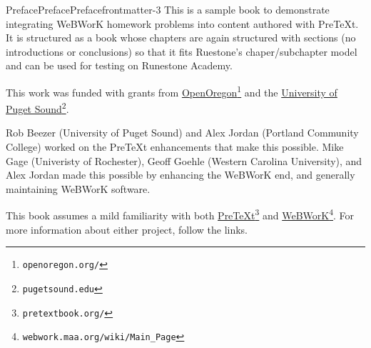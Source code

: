 \documentclass[oneside,10pt,]{book}
\numberwithin{equation}{section}
\begin{document}
\begin{preface}{Preface}{Preface}{}{Preface}{}{}{frontmatter-3}
This is a sample book to demonstrate integrating WeBWorK homework problems into content authored with PreTeXt.  It is structured as a book whose chapters are again structured with sections (no introductions or conclusions) so that it fits Ruestone's chaper\slash{}subchapter model and can be used for testing on Runestone Academy.%
\par
This work was funded with grants from \href{http://openoregon.org/}{OpenOregon}\footnote{\nolinkurl{openoregon.org/}\label{frontmatter-3-2-2}} and the \href{http://pugetsound.edu}{University of Puget Sound}\footnote{\nolinkurl{pugetsound.edu}\label{frontmatter-3-2-4}}.%
\par
Rob Beezer (University of Puget Sound) and Alex Jordan (Portland Community College) worked on the PreTeXt enhancements that make this possible. Mike Gage (Univeristy of Rochester), Geoff Goehle (Western Carolina University), and Alex Jordan made this possible by enhancing the WeBWorK end, and generally maintaining WeBWorK software.%
\par
This book assumes a mild familiarity with both \href{https://pretextbook.org/}{PreTeXt}\footnote{\nolinkurl{pretextbook.org/}\label{frontmatter-3-4-2}} and \href{http://webwork.maa.org/wiki/Main_Page}{WeBWorK}\footnote{\nolinkurl{webwork.maa.org/wiki/Main_Page}\label{frontmatter-3-4-4}}. For more information about either project, follow the links.%
\end{preface}
\setcounter{tocdepth}{1}
\renewcommand*\contentsname{Contents}
\tableofcontents
\mainmatter
%
%
\typeout{************************************************}
\typeout{************************************************}
%
\end{document}
